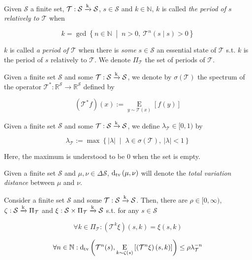\documentclass[anon,12pt]{colt2018} %
\newcommand{\AP}[1]{\left(#1\right)}
\newcommand{\AB}[1]{\left[#1\right]}
\newcommand{\ACM}[2]{\left\{#1\;\middle\vert\;#2\right\}}
\newcommand{\Ea}[2]{\underset{#1}{\operatorname{E}}\AB{#2}}
\newcommand{\Dtva}[1]{\operatorname{d}_{\textnormal{tv}}\AP{#1}}
\newcommand{\Nats}{\mathbb{N}}
\newcommand{\Reals}{\mathbb{R}}
\newcommand{\Abs}[1]{\left\vert #1 \right\vert}
\newcommand{\K}{\xrightarrow{\textnormal{k}}}
\newcommand{\St}{\mathcal{S}}
\newcommand{\T}{\mathcal{T}}
\begin{document}
\begin{samepage}
\begin{definition}

Given $\St$ a finite set, $\T: \St \K \St$, $s \in \St$ and $k \in \Nats$, $k$ is called \emph{the period of $s$ relatively to $\T$} when 

\begin{equation}
k = \gcd \ACM{n \in \Nats}{n > 0,\ \T^n(s \mid s) > 0}
\end{equation}

$k$ is called \emph{a period of $\T$} when there is \emph{some} $s \in \St$ an essential state of $\T$ s.t. $k$ is the period of $s$ relatively to $\T$. We denote $\Pi_\T$ the set of periods of $\T$.

\end{definition}
\end{samepage}

Given a finite set $\St$ and some $\T: \St \K \St$, we denote by $\sigma(\T)$ the spectrum of the operator $\T^*: \Reals^\St \rightarrow \Reals^\St$ defined by

\[\AP{\T^*f}(x):=\Ea{y\sim \T(x)}{f(y)}\]

\begin{samepage}
\begin{definition}

Given a finite set $\St$ and some $\T: \St \K \St$, we define $\lambda_\T\in[0,1)$ by

\begin{equation}
\lambda_\T := \max\ACM{\Abs{\lambda}}{\lambda \in \sigma\AP{\T},\ \Abs{\lambda} < 1}
\end{equation}

Here, the maximum is understood to be 0 when the set is empty.

\end{definition}
\end{samepage}

Given a finite set $\St$ and $\mu,\nu \in \Delta\St$, $\Dtva{\mu,\nu}$ will denote the \emph{total variation distance} between $\mu$ and $\nu$.

\begin{samepage}
\begin{proposition}
\label{prp:mixing_time}

Consider a finite set $\St$ and some $\T: \St \K \St$. Then, there are $\rho\in[0,\infty)$, $\zeta: \St \K \Pi_\T$ and $\xi: \St \times \Pi_\T \K \St$ s.t. for any $s\in\St$

\begin{equation}
\label{eqn:prp__mixing_time_periodic}
\forall k \in \Pi_\T: \AP{\T^k\xi}(s,k) = \xi(s,k)
\end{equation}

\begin{equation}
\label{eqn:prp__mixing_time_decaying}
\forall n \in \Nats: \Dtva{\T^n(s),\Ea{k\sim\zeta(s)}{\AP{\T^n\xi}(s,k)}} \leq \rho\lambda_\T^{-n}
\end{equation}

\end{proposition}
\end{samepage}
\end{document}
